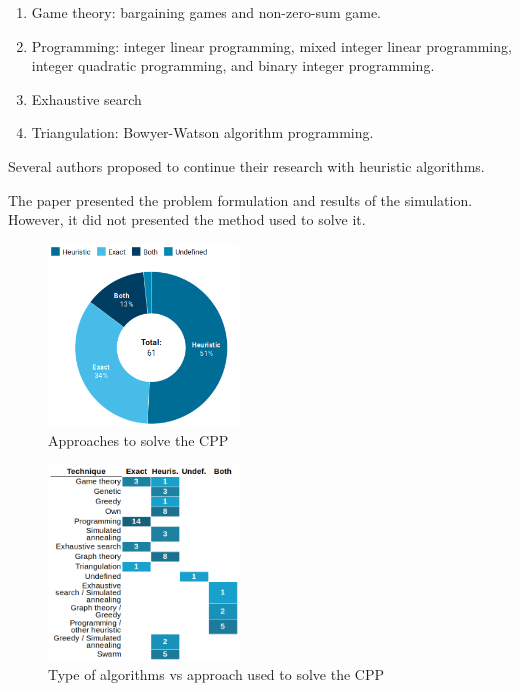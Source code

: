 \documentclass{IEEEtran}
\begin{document}
\begin{enumerate}
    \item Game theory: bargaining games and non-zero-sum game.
    \item Programming: integer linear programming, mixed integer linear programming, integer quadratic programming, and binary integer programming.
    \item Exhaustive search
    \item Triangulation: Bowyer-Watson algorithm
programming. 
\end{enumerate}

Several authors proposed to continue their research with heuristic algorithms. 

The paper \cite{TaYi18} presented the problem formulation and results of the simulation. However, it did not presented the method used to solve it. 

\begin{figure}
    \centering
    \includegraphics[width=0.45\textwidth]{Pictures/approach_Heur_exact.png}
    \caption{Approaches to solve the CPP}
    \label{fig:approach}
\end{figure}

\begin{figure}
    \centering
    \includegraphics[width=0.45\textwidth]{Pictures/tecnique_method.png}
    \caption{Type of algorithms vs approach used to solve the CPP}
    \label{fig:type_algorithms}
\end{figure}
\end{document}
